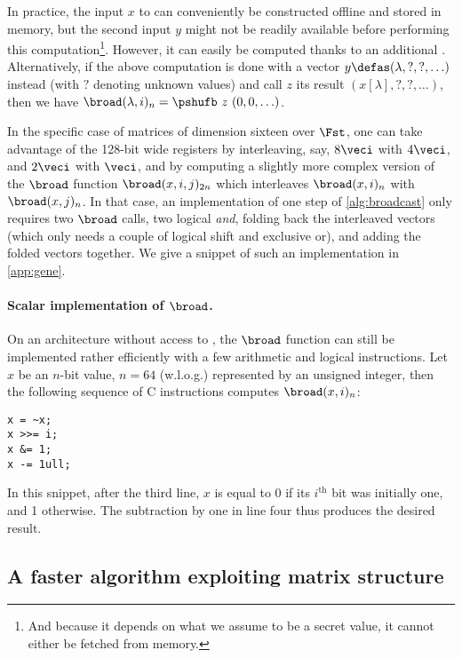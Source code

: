 In practice, the input $x$ to \pshufb{} can conveniently be constructed offline and stored in memory, but the second input $y$ might not be readily available before
performing this computation\footnote{And because it depends on what we assume to be a secret value, it cannot either be fetched from memory.}.
However, it can easily be computed thanks to an additional \pshufb{}. Alternatively, if the
above computation is done with a vector $y \defas (\lambda, ?, ?, \ldots)$ instead (with $?$ denoting unknown values) and call $z$ its result $(x[\lambda], ?, ?, \ldots)$,
then we have $\broad(\lambda, i)_n = \pshufb~z~ (0, 0, \ldots)$.

\medskip

In the specific case of matrices of dimension sixteen over $\Fst$, one can take advantage of the 128-bit
wide \xmm{} registers by interleaving, say, $8\veci$ with $4\veci$, and $2\veci$ with $\veci$, and by computing a slightly more
complex version of the $\broad$ function $\broad(x,i,j)_{2n}$ which interleaves $\broad(x,i)_n$ with $\broad(x,j)_n$.
In that case, an implementation of one step of \autoref{alg:broadcast} only requires two $\broad$ calls, two logical \emph{and}, folding back the interleaved vectors
(which only needs a couple of logical shift and exclusive or), and adding the folded vectors together.
We give a snippet of such an implementation in \autoref{app:gene}.

\paragraph{Scalar implementation of $\broad$.}
On an architecture without access to \pshufb, the $\broad$ function can still be implemented rather efficiently with a few arithmetic and logical instructions.
Let $x$ be an $n$-bit value, $n = 64$ (w.l.o.g.) represented by an unsigned integer, then the following sequence of C instructions computes $\broad(x,i)_n$:
\begin{center}
\begin{verbatim}
x = ~x;
x >>= i;
x &= 1;
x -= 1ull;
\end{verbatim}
\end{center}
In this snippet, after the third line, $x$ is equal to 0 if its $i^\text{th}$ bit was initially one, and 1 otherwise. The subtraction by one in line four thus produces the desired result.

\subsection{A faster algorithm exploiting matrix structure}
\label{shuff}


